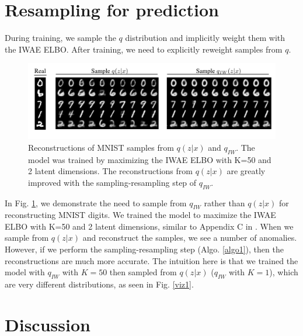 \documentclass{article} %
\begin{document}
\section{Resampling for prediction}
During training, we sample the $q$ distribution and implicitly weight them with the IWAE ELBO. After training, we need to explicitly reweight samples from $q$.

\begin{figure}[h]
  \centering
      \includegraphics[width=1.\textwidth, clip, trim=0cm .5cm 0cm 0cm]{figs/samps.png}
  \caption{Reconstructions of MNIST samples from $q(z|x)$ and $q_{IW}$. The model was trained by maximizing the IWAE ELBO with K=50 and 2 latent dimensions. The reconstructions from $q(z|x)$ are greatly improved with the sampling-resampling step of $q_{IW}$.}
  \label{recon}
\end{figure}

In Fig. \ref{recon}, we demonstrate the need to sample from $q_{IW}$ rather than $q(z|x)$ for reconstructing MNIST digits. We trained the model to maximize the IWAE ELBO with K=50 and 2 latent dimensions, similar to Appendix C in \cite{burda2015importance}. When we sample from $q(z|x)$ and reconstruct the samples, we see a number of anomalies. However, if we perform the sampling-resampling step (Algo. \ref{algo1}), then the reconstructions are much more accurate. The intuition here is that we trained the model with $q_{IW}$ with $K=50$ then sampled from $q(z|x)$ ($q_{IW}$ with $K=1$), which are very different distributions, as seen in Fig. \ref{viz1}.



\section{Discussion}
\end{document}

